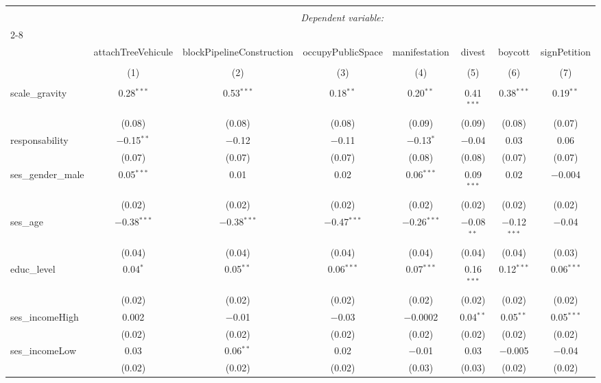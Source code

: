 \documentclass[
]{article}
\begin{document}
\begin{sidewaystable}[!htbp] \centering 
  \caption{Interaction responsabilité des citoyens-préoccupations 2} 
  \label{} 
\begin{tabular}{@{\extracolsep{1pt}}lccccccc} 
\\[-1.8ex]\hline 
\hline \\[-1.8ex] 
 & \multicolumn{7}{c}{\textit{Dependent variable:}} \\ 
\cline{2-8} 
\\[-1.8ex] & attachTreeVehicule & blockPipelineConstruction & occupyPublicSpace & manifestation & divest & boycott & signPetition \\ 
\\[-1.8ex] & (1) & (2) & (3) & (4) & (5) & (6) & (7)\\ 
\hline \\[-1.8ex] 
 scale\_gravity & 0.28$^{***}$ & 0.53$^{***}$ & 0.18$^{**}$ & 0.20$^{**}$ & 0.41$^{***}$ & 0.38$^{***}$ & 0.19$^{**}$ \\ 
  & (0.08) & (0.08) & (0.08) & (0.09) & (0.09) & (0.08) & (0.07) \\ 
  responsability & $-$0.15$^{**}$ & $-$0.12 & $-$0.11 & $-$0.13$^{*}$ & $-$0.04 & 0.03 & 0.06 \\ 
  & (0.07) & (0.07) & (0.07) & (0.08) & (0.08) & (0.07) & (0.07) \\ 
  ses\_gender\_male & 0.05$^{***}$ & 0.01 & 0.02 & 0.06$^{***}$ & 0.09$^{***}$ & 0.02 & $-$0.004 \\ 
  & (0.02) & (0.02) & (0.02) & (0.02) & (0.02) & (0.02) & (0.02) \\ 
  ses\_age & $-$0.38$^{***}$ & $-$0.38$^{***}$ & $-$0.47$^{***}$ & $-$0.26$^{***}$ & $-$0.08$^{**}$ & $-$0.12$^{***}$ & $-$0.04 \\ 
  & (0.04) & (0.04) & (0.04) & (0.04) & (0.04) & (0.04) & (0.03) \\ 
  educ\_level & 0.04$^{*}$ & 0.05$^{**}$ & 0.06$^{***}$ & 0.07$^{***}$ & 0.16$^{***}$ & 0.12$^{***}$ & 0.06$^{***}$ \\ 
  & (0.02) & (0.02) & (0.02) & (0.02) & (0.02) & (0.02) & (0.02) \\ 
  ses\_incomeHigh & 0.002 & $-$0.01 & $-$0.03 & $-$0.0002 & 0.04$^{**}$ & 0.05$^{**}$ & 0.05$^{***}$ \\ 
  & (0.02) & (0.02) & (0.02) & (0.02) & (0.02) & (0.02) & (0.02) \\ 
  ses\_incomeLow & 0.03 & 0.06$^{**}$ & 0.02 & $-$0.01 & 0.03 & $-$0.005 & $-$0.04 \\ 
  & (0.02) & (0.02) & (0.02) & (0.03) & (0.03) & (0.02) & (0.02) \\ 

\end{tabular}
\end{sidewaystable}
\end{document}
